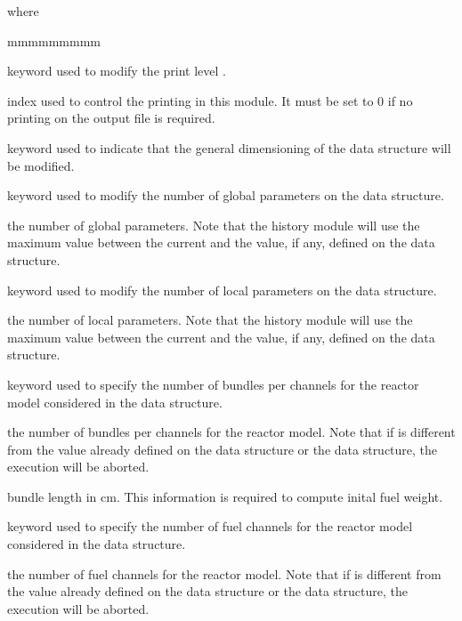 \noindent
 where
\begin{ListeDeDescription}{mmmmmmmmm}   

\item[\moc{EDIT}] keyword used to modify the print level .

\item[\dusa{iprint}] index used to control the printing in this module. It must be set to 0 if no printing on the output file is required. 

\item[\moc{DIMENSIONS}] keyword used to indicate that the general dimensioning of the  data structure will be modified.

\item[\moc{GLOBAL}] keyword used to modify the number of global parameters on the  data structure.

\item[\dusa{nglo}] the number of global parameters. Note that the history module will use the maximum value between the current  and the value, if
any, defined on the  data structure.

\item[\moc{LOCAL}] keyword used to modify the number of local parameters on the  data structure.

\item[\dusa{nloc}] the number of local parameters. Note that the history module will use the maximum value between the current  and the value, if
any, defined on the  data structure.

\item[\moc{BUNBLES}] keyword used to specify the number of bundles per channels for the reactor model considered in the  data structure.

\item[\dusa{nbun}] the number of bundles per channels for the reactor model. Note that if  is different from the value already defined on the
 data structure or the  data structure, the execution will be aborted. 

\item[\dusa{bunl}] bundle length in cm. This information is required to compute inital fuel weight. 

\item[\moc{CHANNELS}] keyword used to specify the number of fuel channels for the reactor model considered in the  data structure.

\item[\dusa{ncha}] the number of fuel channels for the reactor model. Note that if  is different from the value already defined on the 
data structure or the  data structure, the execution will be aborted. 

\end{ListeDeDescription}   

